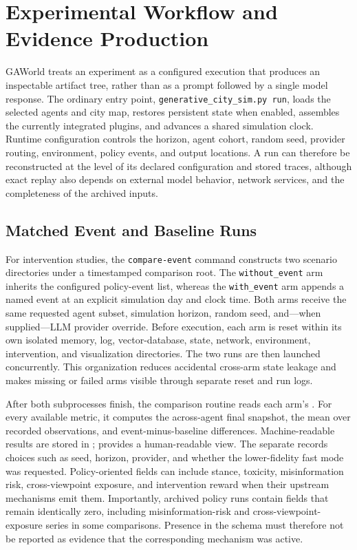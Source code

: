 \section{Experimental Workflow and Evidence Production}
\label{sec:experiment-workflow}

GAWorld treats an experiment as a configured execution that produces an
inspectable artifact tree, rather than as a prompt followed by a single model
response.  The ordinary entry point, \texttt{generative\_city\_sim.py run},
loads the selected agents and city map, restores persistent state when enabled,
assembles the currently integrated plugins, and advances a shared simulation
clock.  Runtime configuration controls the horizon, agent cohort, random seed,
provider routing, environment, policy events, and output locations.  A run can
therefore be reconstructed at the level of its declared configuration and
stored traces, although exact replay also depends on external model behavior,
network services, and the completeness of the archived inputs.

\subsection{Matched Event and Baseline Runs}

For intervention studies, the \texttt{compare-event} command constructs two
scenario directories under a timestamped comparison root.  The
\texttt{without\_event} arm inherits the configured policy-event list, whereas
the \texttt{with\_event} arm appends a named event at an explicit simulation
day and clock time.  Both arms receive the same requested agent subset,
simulation horizon, random seed, and---when supplied---LLM provider override.
Before execution, each arm is reset within its own isolated memory, log,
vector-database, state, network, environment, intervention, and visualization
directories.  The two runs are then launched concurrently.  This organization
reduces accidental cross-arm state leakage and makes missing or failed arms
visible through separate reset and run logs.

After both subprocesses finish, the comparison routine reads each arm's
.  For every available metric, it
computes the across-agent final snapshot, the mean over recorded observations,
and event-minus-baseline differences.  Machine-readable results are stored in
;  provides a
human-readable view.  The separate  records choices such
as seed, horizon, provider, and whether the lower-fidelity fast mode was
requested.  Policy-oriented fields can include stance, toxicity,
misinformation risk, cross-viewpoint exposure, and intervention reward when
their upstream mechanisms emit them.  Importantly, archived policy runs contain
fields that remain identically zero, including misinformation-risk and
cross-viewpoint-exposure series in some comparisons.  Presence in the schema
must therefore not be reported as evidence that the corresponding mechanism was
active.

